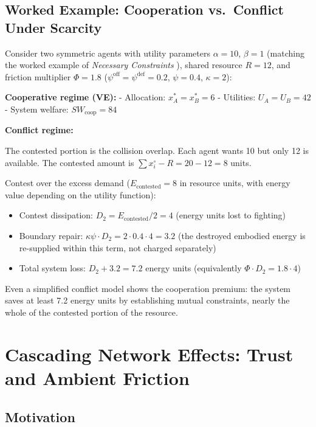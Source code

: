 \documentclass[11pt]{article}
\theoremstyle{plain}
\theoremstyle{definition}
\theoremstyle{remark}
\let\origsection\section
\renewcommand{\section}{\needspace{12\baselineskip}\origsection}
\let\origsubsection\subsection
\renewcommand{\subsection}{\needspace{7\baselineskip}\origsubsection}
\providecommand{\tightlist}{%
  \setlength{\itemsep}{0pt}\setlength{\parskip}{0pt}}
\begin{document}
\subsection{Worked Example: Cooperation vs.~Conflict Under
Scarcity}\label{worked-example-cooperation-vs.-conflict-under-scarcity}

Consider two symmetric agents with utility parameters \(\alpha = 10\),
\(\beta = 1\) (matching the worked example of \emph{Necessary
Constraints} \citep{TC-I}), shared resource \(R = 12\), and friction
multiplier \(\Phi = 1.8\)
(\(\psi^{\text{off}} = \psi^{\text{def}} = 0.2\), \(\psi = 0.4\),
\(\kappa = 2\)):

\textbf{Cooperative regime (VE):} - Allocation: \(x_A^* = x_B^* = 6\) -
Utilities: \(U_A = U_B = 42\) - System welfare:
\(SW_{\text{coop}} = 84\)

\textbf{Conflict regime:}

The contested portion is the collision overlap. Each agent wants 10 but
only 12 is available. The contested amount is
\(\sum x_i^{\circ} - R = 20 - 12 = 8\) units.

Contest over the excess demand (\(E_{\text{contested}} = 8\) in resource
units, with energy value depending on the utility function):

\begin{itemize}
\tightlist
\item
  Contest dissipation: \(D_2 = E_{\text{contested}}/2 = 4\) (energy
  units lost to fighting)
\item
  Boundary repair: \(\kappa \psi \cdot D_2 = 2 \cdot 0.4 \cdot 4 = 3.2\)
  (the destroyed embodied energy is re-supplied within this term, not
  charged separately)
\item
  Total system loss: \(D_2 + 3.2 = 7.2\) energy units (equivalently
  \(\Phi \cdot D_2 = 1.8 \cdot 4\))
\end{itemize}

Even a simplified conflict model shows the cooperation premium: the
system saves at least 7.2 energy units by establishing mutual
constraints, nearly the whole of the contested portion of the resource.

\section{Cascading Network Effects: Trust and Ambient
Friction}\label{cascading-network-effects-trust-and-ambient-friction}

\subsection{Motivation}\label{motivation}
\end{document}

